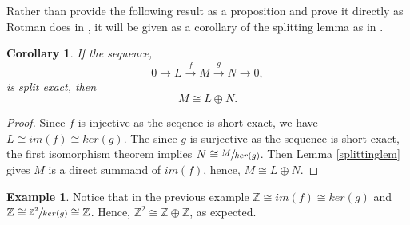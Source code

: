 \documentclass[11.5pt, twoside, a4paper, titlepage]{report}
\providecommand{\bb}[1]{\mathbb{#1}}
\theoremstyle{definition}
\newtheorem{eg}[mydef]{Example}
\theoremstyle{plain}
\newtheorem{cor}[mydef]{Corollary}
\begin{document}
Rather than provide the following result as a proposition and prove it directly as Rotman does in \cite{Rotman}, it will be given as a corollary of the splitting lemma as in \cite{Schiff}.

\begin{cor} \label{MLNcor}
If the sequence,
\begin{equation*}
0\xrightarrow{}L\xrightarrow{f} M \xrightarrow{g} N \xrightarrow{} 0,
\end{equation*}
is split exact, then
\begin{equation*}
M \cong L \oplus N.
\end{equation*}
\end{cor}
\begin{proof}
Since $f$ is injective as the seqence is short exact, we have $L \cong im(f) \cong ker(g)$. The since $g$ is surjective as the sequence is short exact, the first isomorphism theorem implies $N \cong \sfrac{M}{ker(g)}$. Then Lemma \ref{splittinglem} gives $M$  is a direct summand of $im(f)$, hence, $M\cong L \oplus N$.
\end{proof}

\begin{eg}
Notice that in the previous example $\bb{Z} \cong im(f)\cong ker(g) $ and $\bb{Z} \cong \sfrac{\bb{Z}^2}{ker(g)}\cong \bb{Z}$. Hence, $\bb{Z}^2 \cong \bb{Z} \oplus \bb{Z}$, as expected.
\end{eg}
\end{document}
